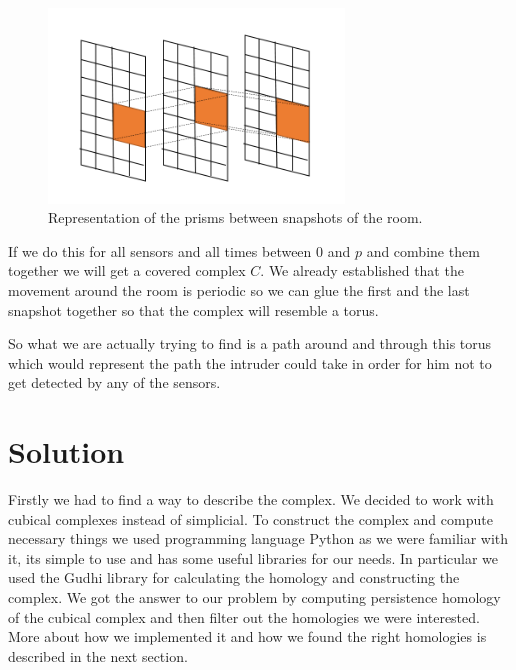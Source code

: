\documentclass{article}
\begin{document}
 \begin{figure}[!h]
    \centering
    \includegraphics[width=0.7\textwidth]{complex}
    \caption{Representation of the prisms between snapshots of the room.}
    \label{fig:complex}
\end{figure}
 
 If we do this for all sensors and all times between 0 and $p$ and combine them together we will get a covered complex $C$. We already established that the movement around the room is periodic so we can glue the first and the last snapshot together so that the complex will resemble a torus. 

So what we are actually trying to find is a path around and through this torus which would represent the path the intruder could take in order for him not to get detected by any of the sensors. 




\section{Solution}

%

Firstly we had to find a way to describe the complex. We decided to work with cubical complexes instead of simplicial. To construct the complex and compute necessary things we used  programming language Python as we were familiar with it, its simple to use and has some useful libraries for our needs. In particular we used the Gudhi library for calculating the homology and constructing the complex. We got the answer to our problem by computing persistence homology of the cubical complex and then filter out the homologies we were interested. More about how we implemented it and how we found the right homologies is described in the next section.
\end{document}
